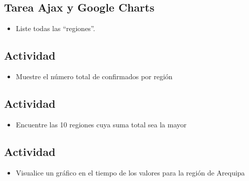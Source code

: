 \documentclass{article}
\begin{document}
\subsection{Tarea Ajax y Google Charts}
        \begin{itemize}	
		\item  Liste todas las “regiones”.
            \end{itemize}
         
         


         
         \subsection{Actividad}
        \begin{itemize}	
		\item  Muestre el número total de confirmados por región
            \end{itemize}
         
         
         
         \subsection{Actividad}
        \begin{itemize}	
		\item  Encuentre las 10 regiones cuya suma total sea la mayor
            \end{itemize}
         
         
         
         \subsection{Actividad}
        \begin{itemize}	
		\item  Visualice un gráfico en el tiempo de los valores para la región de Arequipa
            \end{itemize}
         
         
\end{document}
